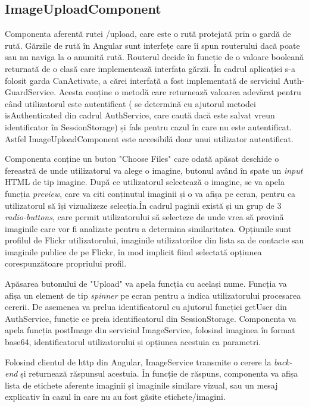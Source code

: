  \subsection{ImageUploadComponent}
Componenta aferentă rutei /upload, care este o rută protejată prin o gardă de rută. Gărzile de rută în Angular sunt interfețe care îi spun routerului dacă poate sau nu naviga la o anumită rută. Routerul decide în funcție de o valoare booleană returnată de o clasă care implementează interfața gărzii. În cadrul aplicației s-a folosit garda CanActivate, a cărei interfață a fost implementată de serviciul Auth-GuardService. Acesta conține o metodă care returnează valoarea adevărat pentru când utilizatorul este autentificat ( se determină cu ajutorul metodei isAuthenticated din cadrul AuthService, care caută dacă este salvat vreun identificator în SessionStorage) și fals pentru cazul în care nu este autentificat. Astfel ImageUploadComponent este accesibilă doar unui utilizator autentificat.

Componenta conține un buton "Choose Files" care odată apăsat deschide o fereastră de unde utilizatorul va alege o imagine, butonul având în spate un \textit{input} HTML de tip imagine. După ce utilizatorul selectează o imagine, se va apela funcția \textit{preview}, care va citi conținutul imaginii și o va afișa pe ecran, pentru ca utilizatorul să își vizualizeze selecția.În cadrul paginii există și un grup de 3 \textit{radio-buttons}, care permit utilizatorului să selecteze de unde vrea să provină imaginile care vor fi analizate pentru a determina similaritatea. Opțiunile sunt profilul de Flickr utilizatorului, imaginile utilizatorilor din lista sa de contacte sau imaginile publice de pe Flickr, în mod implicit fiind selectată opțiunea corespunzătoare propriului profil.

Apăsarea butonului de "Upload" va apela funcția cu același nume. Funcția va afișa un element de tip \textit{spinner} pe ecran pentru a indica utilizatorului procesarea cererii. De asemenea va prelua identificatorul cu ajutorul funcției getUser din AuthService, funcție ce preia identificatorul din SessionStorage. Componenta va apela funcția postImage din serviciul ImageService, folosind imaginea în format base64,  identificatorul utilizatorului și opțiunea acestuia ca parametri.

Folosind clientul de http din Angular, ImageService transmite o cerere la \textit{back-end} și returnează răspunsul acestuia. În funcție de răspuns, componenta va afișa lista de etichete aferente imaginii și imaginile similare vizual, sau un mesaj explicativ în cazul în care nu au fost găsite etichete/imagini.

